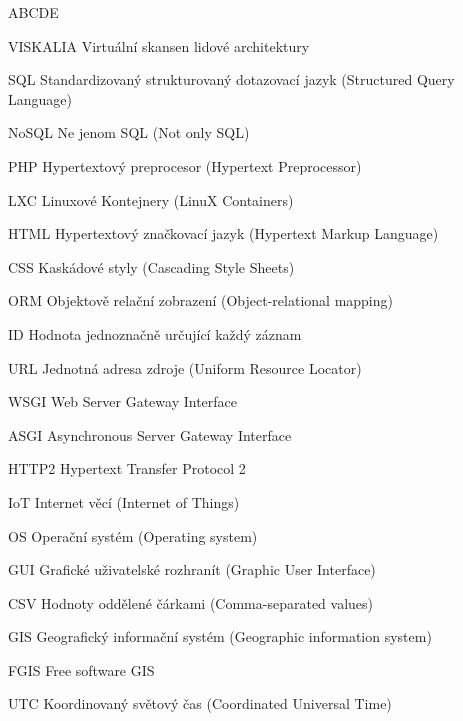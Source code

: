 \begin{seznamzkratek}{ABCDE}      

          {VISKALIA}
          {Virtuální skansen lidové architektury} 

          {SQL}
          {Standardizovaný strukturovaný dotazovací jazyk (Structured Query Language)} 

          {NoSQL}
          {Ne jenom SQL (Not only SQL)} 

	{PHP}
	{Hypertextový preprocesor (Hypertext Preprocessor)}

	{LXC}
	{Linuxové Kontejnery (LinuX Containers)}

	{HTML}
	{Hypertextový značkovací jazyk (Hypertext Markup Language)}  
	             	                   
          {CSS}
          {Kaskádové styly (Cascading Style Sheets)} 
          
	{ORM}
	{Objektově relační zobrazení (Object-relational mapping)}
            
	{ID}
	{Hodnota jednoznačně určující každý záznam} 	      	     
          
          {URL}
          {Jednotná adresa zdroje (Uniform Resource Locator)}                
          
	{WSGI}
	{Web Server Gateway Interface}
                                          
          {ASGI}
          {Asynchronous Server Gateway Interface} 	
          
          {HTTP2}
          {Hypertext Transfer Protocol 2} 	

          {IoT}
          {Internet věcí (Internet of Things)} 	

          {OS}
          {Operační systém (Operating system)} 	

          {GUI}
          {Grafické uživatelské rozhranít (Graphic User Interface)} 	

          {CSV}
          {Hodnoty oddělené čárkami (Comma-separated values)} 	

          {GIS}
          {Geografický informační systém (Geographic information system)} 	

          {FGIS}
          {Free software GIS} 	

          {UTC}
          {Koordinovaný světový čas (Coordinated Universal Time)} 

	
     	      
\end{seznamzkratek}